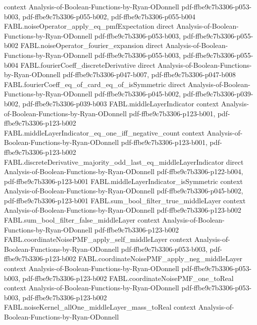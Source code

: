 \begin{theorem}
  {context}
  {Analysis-of-Boolean-Functions-by-Ryan-ODonnell}
  {pdf-ffbe9c7b3306-p053-b003,
    pdf-ffbe9c7b3306-p055-b002,
    pdf-ffbe9c7b3306-p055-b004}
\proofstep
  {FABL.noiseOperator_apply_eq_pmfExpectation}
  {direct}
  {Analysis-of-Boolean-Functions-by-Ryan-ODonnell}
  {pdf-ffbe9c7b3306-p053-b003,
    pdf-ffbe9c7b3306-p055-b002}
\proofstep
  {FABL.noiseOperator_fourier_expansion}
  {direct}
  {Analysis-of-Boolean-Functions-by-Ryan-ODonnell}
  {pdf-ffbe9c7b3306-p055-b003,
    pdf-ffbe9c7b3306-p055-b004}
\proofstep
  {FABL.fourierCoeff_discreteDerivative}
  {direct}
  {Analysis-of-Boolean-Functions-by-Ryan-ODonnell}
  {pdf-ffbe9c7b3306-p047-b007,
    pdf-ffbe9c7b3306-p047-b008}
\proofstep
  {FABL.fourierCoeff_eq_of_card_eq_of_isSymmetric}
  {direct}
  {Analysis-of-Boolean-Functions-by-Ryan-ODonnell}
  {pdf-ffbe9c7b3306-p045-b002,
    pdf-ffbe9c7b3306-p039-b002,
    pdf-ffbe9c7b3306-p039-b003}
\proofstep
  {FABL.middleLayerIndicator}
  {context}
  {Analysis-of-Boolean-Functions-by-Ryan-ODonnell}
  {pdf-ffbe9c7b3306-p123-b001,
    pdf-ffbe9c7b3306-p123-b002}
\proofstep
  {FABL.middleLayerIndicator_eq_one_iff_negative_count}
  {context}
  {Analysis-of-Boolean-Functions-by-Ryan-ODonnell}
  {pdf-ffbe9c7b3306-p123-b001,
    pdf-ffbe9c7b3306-p123-b002}
\proofstep
  {FABL.discreteDerivative_majority_odd_last_eq_middleLayerIndicator}
  {direct}
  {Analysis-of-Boolean-Functions-by-Ryan-ODonnell}
  {pdf-ffbe9c7b3306-p122-b004,
    pdf-ffbe9c7b3306-p123-b001}
\proofstep
  {FABL.middleLayerIndicator_isSymmetric}
  {context}
  {Analysis-of-Boolean-Functions-by-Ryan-ODonnell}
  {pdf-ffbe9c7b3306-p045-b002,
    pdf-ffbe9c7b3306-p123-b001}
\proofstep
  {FABL.sum_bool_filter_true_middleLayer}
  {context}
  {Analysis-of-Boolean-Functions-by-Ryan-ODonnell}
  {pdf-ffbe9c7b3306-p123-b002}
\proofstep
  {FABL.sum_bool_filter_false_middleLayer}
  {context}
  {Analysis-of-Boolean-Functions-by-Ryan-ODonnell}
  {pdf-ffbe9c7b3306-p123-b002}
\proofstep
  {FABL.coordinateNoisePMF_apply_self_middleLayer}
  {context}
  {Analysis-of-Boolean-Functions-by-Ryan-ODonnell}
  {pdf-ffbe9c7b3306-p053-b003,
    pdf-ffbe9c7b3306-p123-b002}
\proofstep
  {FABL.coordinateNoisePMF_apply_neg_middleLayer}
  {context}
  {Analysis-of-Boolean-Functions-by-Ryan-ODonnell}
  {pdf-ffbe9c7b3306-p053-b003,
    pdf-ffbe9c7b3306-p123-b002}
\proofstep
  {FABL.coordinateNoisePMF_one_toReal}
  {context}
  {Analysis-of-Boolean-Functions-by-Ryan-ODonnell}
  {pdf-ffbe9c7b3306-p053-b003,
    pdf-ffbe9c7b3306-p123-b002}
\proofstep
  {FABL.noiseKernel_allOne_middleLayer_mass_toReal}
  {context}
  {Analysis-of-Boolean-Functions-by-Ryan-ODonnell}

\end{theorem}
